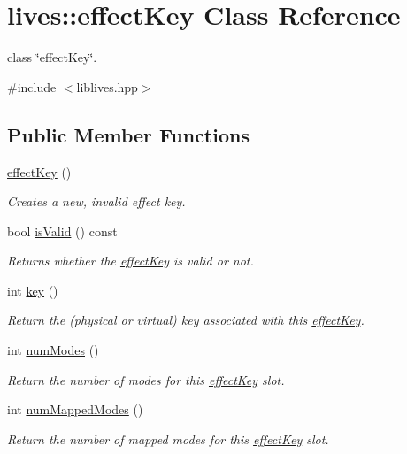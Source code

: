 \hypertarget{classlives_1_1effectKey}{\section{lives\-:\-:effect\-Key Class Reference}
\label{classlives_1_1effectKey}
}


class \char`\"{}effect\-Key\char`\"{}.  




{\ttfamily \#include $<$liblives.\-hpp$>$}

\subsection*{Public Member Functions}
\begin{DoxyCompactItemize}
\item 
\hyperlink{classlives_1_1effectKey_a4dfc621647eec6ef95e0cd07e96317c4}{effect\-Key} ()
\begin{DoxyCompactList}\small\item\em Creates a new, invalid effect key. \end{DoxyCompactList}\item 
bool \hyperlink{classlives_1_1effectKey_addeea27aff7ce581cb180c86ed265ff5}{is\-Valid} () const 
\begin{DoxyCompactList}\small\item\em Returns whether the \hyperlink{classlives_1_1effectKey}{effect\-Key} is valid or not. \end{DoxyCompactList}\item 
int \hyperlink{classlives_1_1effectKey_a85b593e043742bf99b2eabaa4147416f}{key} ()
\begin{DoxyCompactList}\small\item\em Return the (physical or virtual) key associated with this \hyperlink{classlives_1_1effectKey}{effect\-Key}. \end{DoxyCompactList}\item 
int \hyperlink{classlives_1_1effectKey_a46957ebba6461246a708fdfa8a815eb7}{num\-Modes} ()
\begin{DoxyCompactList}\small\item\em Return the number of modes for this \hyperlink{classlives_1_1effectKey}{effect\-Key} slot. \end{DoxyCompactList}\item 
int \hyperlink{classlives_1_1effectKey_af68fdec3fb53242e630ebd5d398e9bed}{num\-Mapped\-Modes} ()
\begin{DoxyCompactList}\small\item\em Return the number of mapped modes for this \hyperlink{classlives_1_1effectKey}{effect\-Key} slot. \end{DoxyCompactList}\item 

\end{DoxyCompactItemize}
